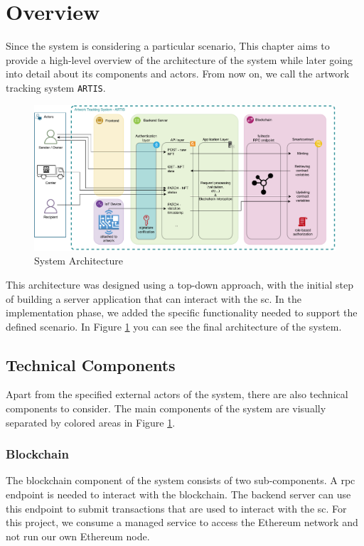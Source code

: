 \section{Overview}
\label{sec:overview}
Since the system is considering a particular scenario, This chapter aims to provide a high-level overview of the architecture of the system while later going into detail about its components and actors. From now on, we call the artwork tracking system \texttt{ARTIS}.

\begin{figure}[ht]
    \centering
    \includegraphics[width=\textwidth, keepaspectratio]{diagrams/architecture.drawio.pdf}
    \caption{System Architecture}
    \label{fig:architecture}
\end{figure}


This architecture was designed using a top-down approach, with the initial step of building a server application that can interact with the \gls{sc}. In the implementation phase, we added the specific functionality needed to support the defined scenario. In Figure \ref{fig:architecture} you can see the final architecture of the system. 

\subsection{Technical Components}
Apart from the specified external actors of the system, there are also technical components to consider. The main components of the system are visually separated by colored areas in Figure \ref{fig:architecture}.

\subsubsection{Blockchain}
The blockchain component of the system consists of two sub-components. A \gls{rpc} endpoint is needed to interact with the blockchain. The backend server can use this endpoint to submit transactions that are used to interact with the \gls{sc}. For this project, we consume a managed service to access the Ethereum network and not run our own Ethereum node.

